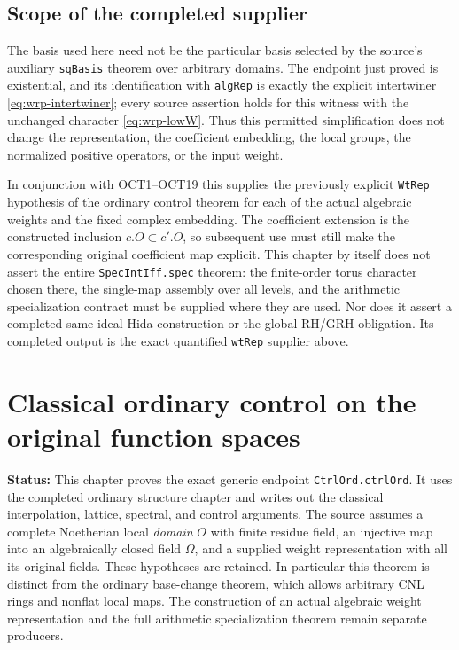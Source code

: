\documentclass[11pt,a4paper]{article}
\numberwithin{equation}{section}
\theoremstyle{remark}\newtheorem{remark}[theorem]{Remark}
\newcommand{\status}[1]{\textbf{Status:} #1}
\begin{document}
\subsection{Scope of the completed supplier}

The basis used here need not be the particular basis
selected by the source's auxiliary \texttt{sq\allowbreak Basis}
theorem over arbitrary domains.  The endpoint just
proved is existential, and its identification with
\texttt{alg\allowbreak Rep} is exactly the explicit intertwiner
\eqref{eq:wrp-intertwiner}; every source assertion holds
for this witness with the unchanged character
\eqref{eq:wrp-lowW}.  Thus this permitted simplification
does not change the representation, the coefficient
embedding, the local groups, the normalized positive
operators, or the input weight.

In conjunction with OCT1--OCT19 this supplies the
previously explicit \texttt{Wt\allowbreak Rep} hypothesis of the
ordinary control theorem for each of the actual
algebraic weights and the fixed complex embedding.
The coefficient extension is the constructed inclusion
$c.O\subset c'.O$, so subsequent use must still make
the corresponding original coefficient map explicit.
This chapter by itself does not assert the entire
\texttt{Spec\allowbreak Int\allowbreak Iff.\allowbreak spec} theorem: the finite-order torus
character chosen there, the single-map assembly over
all levels, and the arithmetic specialization contract
must be supplied where they are used.  Nor does it
assert a completed same-ideal Hida construction or
the global RH/GRH obligation.  Its completed output
is the exact quantified \texttt{wt\allowbreak Rep} supplier above.


\section{Classical ordinary control on the original function spaces}
\label{sec:ordinary-control-v42}

\status{This chapter proves the exact generic endpoint
\texttt{Ctrl\allowbreak Ord.\allowbreak ctrl\allowbreak Ord}.  It uses the completed ordinary structure
chapter and writes out the classical interpolation, lattice, spectral,
and control arguments.  The source assumes a complete Noetherian local
\emph{domain} $O$ with finite residue field, an injective map into an
algebraically closed field $\Omega$, and a supplied weight representation
with all its original fields.  These hypotheses are retained.  In
particular this theorem is distinct from the ordinary base-change
theorem, which allows arbitrary CNL rings and nonflat local maps.  The
construction of an actual algebraic weight representation and the full
arithmetic specialization theorem remain separate producers.}
\end{document}
